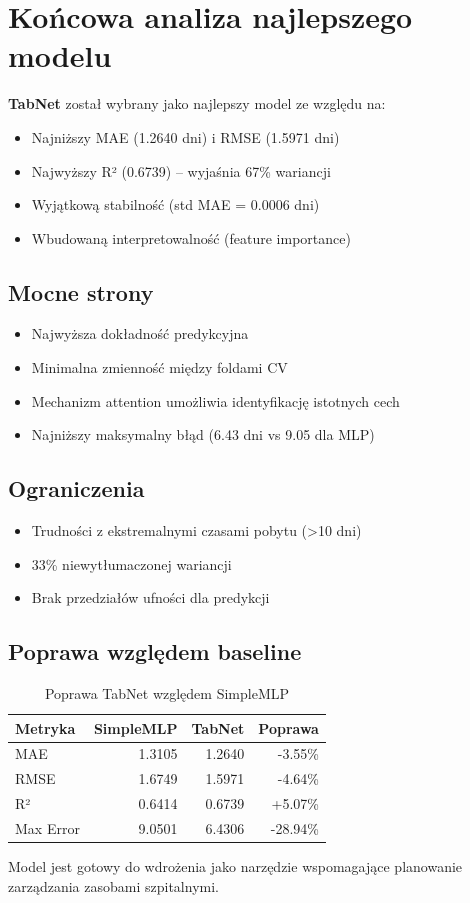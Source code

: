 \section{Końcowa analiza najlepszego modelu}

\textbf{TabNet} został wybrany jako najlepszy model ze względu na:

\begin{itemize}
    \item Najniższy MAE (1.2640 dni) i RMSE (1.5971 dni)
    \item Najwyższy R² (0.6739) -- wyjaśnia 67\% wariancji
    \item Wyjątkową stabilność (std MAE = 0.0006 dni)
    \item Wbudowaną interpretowalność (feature importance)
\end{itemize}

\subsection{Mocne strony}

\begin{itemize}
    \item Najwyższa dokładność predykcyjna
    \item Minimalna zmienność między foldami CV
    \item Mechanizm attention umożliwia identyfikację istotnych cech
    \item Najniższy maksymalny błąd (6.43 dni vs 9.05 dla MLP)
\end{itemize}

\subsection{Ograniczenia}

\begin{itemize}
    \item Trudności z ekstremalnymi czasami pobytu (>10 dni)
    \item 33\% niewytłumaczonej wariancji
    \item Brak przedziałów ufności dla predykcji
\end{itemize}

\subsection{Poprawa względem baseline}

\begin{table}[H]
\centering
\caption{Poprawa TabNet względem SimpleMLP}
\begin{tabular}{lrrr}
\toprule
Metryka & SimpleMLP & TabNet & Poprawa \\
\midrule
MAE & 1.3105 & 1.2640 & -3.55\% \\
RMSE & 1.6749 & 1.5971 & -4.64\% \\
R² & 0.6414 & 0.6739 & +5.07\% \\
Max Error & 9.0501 & 6.4306 & -28.94\% \\
\bottomrule
\end{tabular}
\end{table}

Model jest gotowy do wdrożenia jako narzędzie wspomagające planowanie zarządzania zasobami szpitalnymi.
